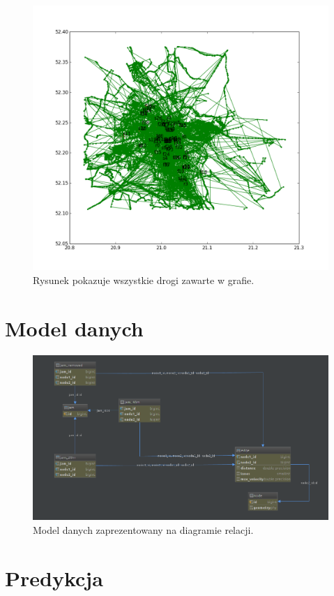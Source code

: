 \documentclass[a4paper,12pt]{mwart}
\begin{document}
\begin{figure}[h]
\centerline{\includegraphics[width=\textwidth]{figures/map.png}}
\caption{Rysunek pokazuje wszystkie drogi zawarte w grafie.}
\end{figure}

\section{Model danych}

\begin{figure}[H]
\centerline{\includegraphics[width=\textwidth]{figures/diagram.png}}
\caption{Model danych zaprezentowany na diagramie relacji.}
\end{figure}

\section{Predykcja}
\end{document}
